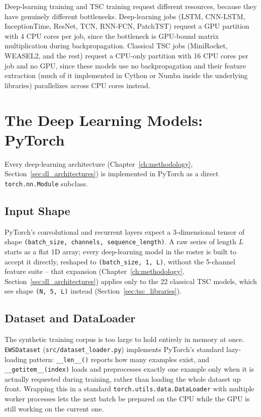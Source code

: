 Deep-learning training and TSC training request different resources, because they have genuinely different bottlenecks. Deep-learning jobs (LSTM, CNN-LSTM, InceptionTime, ResNet, TCN, RNN-FCN, PatchTST) request a GPU partition with 4 CPU cores per job, since the bottleneck is GPU-bound matrix multiplication during backpropagation. Classical TSC jobs (MiniRocket, WEASEL2, and the rest) request a CPU-only partition with 16 CPU cores per job and no GPU, since these models use no backpropagation and their feature extraction (much of it implemented in Cython or Numba inside the underlying libraries) parallelizes across CPU cores instead.

\section{The Deep Learning Models: PyTorch}

Every deep-learning architecture (Chapter~\ref{ch:methodology}, Section~\ref{sec:dl_architectures}) is implemented in PyTorch \citep{paszke2019pytorch} as a direct \texttt{torch.nn.Module} subclass.

\subsection{Input Shape}

PyTorch's convolutional and recurrent layers expect a 3-dimensional tensor of shape \texttt{(batch\_size, channels, sequence\_length)}. A raw series of length $L$ starts as a flat 1D array; every deep-learning model in the roster is built to accept it directly, reshaped to \texttt{(batch\_size, 1, L)}, without the 5-channel feature suite -- that expansion (Chapter~\ref{ch:methodology}, Section~\ref{sec:dl_architectures}) applies only to the 22 classical TSC models, which see shape \texttt{(N, 5, L)} instead (Section~\ref{sec:tsc_libraries}).

\subsection{Dataset and DataLoader}

The synthetic training corpus is too large to hold entirely in memory at once. \texttt{EWSDataset} (\texttt{src/dataset\_loader.py}) implements PyTorch's standard lazy-loading pattern: \texttt{\_\_len\_\_()} reports how many examples exist, and \texttt{\_\_getitem\_\_(index)} loads and preprocesses exactly one example only when it is actually requested during training, rather than loading the whole dataset up front. Wrapping this in a standard \texttt{torch.utils.data.DataLoader} with multiple worker processes lets the next batch be prepared on the CPU while the GPU is still working on the current one.

